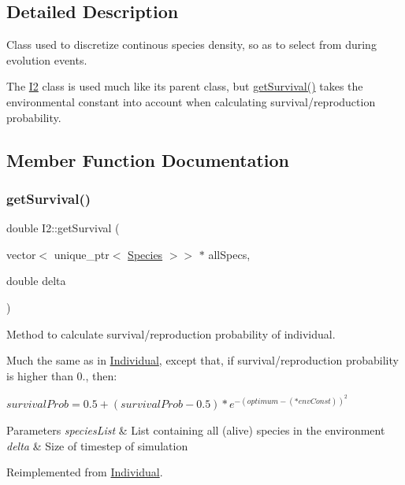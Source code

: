 \subsection{Detailed Description}
Class used to discretize continous species density, so as to select from during evolution events. 

The \hyperlink{classI2}{I2} class is used much like its parent class, but \hyperlink{classI2_ac747249e352a954b96a530537c60d3b1}{get\+Survival()} takes the environmental constant into account when calculating survival/reproduction probability. 

\subsection{Member Function Documentation}
\mbox{\label{classI2_ac747249e352a954b96a530537c60d3b1}} 
\subsubsection{\texorpdfstring{get\+Survival()}{getSurvival()}}
{\footnotesize\ttfamily double I2\+::get\+Survival (\begin{DoxyParamCaption}\item[{vector$<$ unique\+\_\+ptr$<$ \hyperlink{classSpecies}{Species} $>$$>$ $\ast$}]{all\+Specs,  }\item[{double}]{delta }\end{DoxyParamCaption})\hspace{0.3cm}{\ttfamily [virtual]}}



Method to calculate survival/reproduction probability of individual. 

Much the same as in \hyperlink{classIndividual}{Individual}, except that, if survival/reproduction probability is higher than 0., then\+:

$survivalProb = 0.5 + (survivalProb - 0.5)*e^{-(optimum-(*envConst))^2}$


\begin{DoxyParams}{Parameters}
{\em species\+List} & List containing all (alive) species in the environment \\
\hline
{\em delta} & Size of timestep of simulation \\
\hline
\end{DoxyParams}


Reimplemented from \hyperlink{classIndividual_a895954f2c3a683dd3bd7475651a38160}{Individual}.



